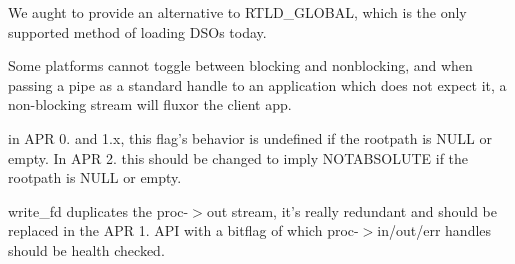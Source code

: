 
\begin{DoxyRefList}
\item[\label{bug__bug000001}%
\hypertarget{bug__bug000001}{}%
Global \hyperlink{group__apr__dso_gaedc8609c2bb76e5c43f2df2281a9d8b6}{apr\-\_\-dso\-\_\-load} (apr\-\_\-dso\-\_\-handle\-\_\-t $\ast$$\ast$res\-\_\-handle, const char $\ast$path, apr\-\_\-pool\-\_\-t $\ast$ctx)]We aught to provide an alternative to R\-T\-L\-D\-\_\-\-G\-L\-O\-B\-A\-L, which is the only supported method of loading D\-S\-Os today.  
\item[\label{bug__bug000003}%
\hypertarget{bug__bug000003}{}%
Global \hyperlink{group__apr__file__io_gaae3b81342d239c58c351cf11190740ed}{apr\-\_\-file\-\_\-pipe\-\_\-create} (apr\-\_\-file\-\_\-t $\ast$$\ast$in, apr\-\_\-file\-\_\-t $\ast$$\ast$out, apr\-\_\-pool\-\_\-t $\ast$pool)]Some platforms cannot toggle between blocking and nonblocking, and when passing a pipe as a standard handle to an application which does not expect it, a non-\/blocking stream will fluxor the client app.  
\item[\label{bug__bug000002}%
\hypertarget{bug__bug000002}{}%
Global \hyperlink{group__apr__filepath_gabb57ce7b23caf512d7f64b92a662ab3d}{A\-P\-R\-\_\-\-F\-I\-L\-E\-P\-A\-T\-H\-\_\-\-N\-O\-T\-A\-B\-O\-V\-E\-R\-O\-O\-T} ]in A\-P\-R 0. and 1.\-x, this flag's behavior is undefined if the rootpath is N\-U\-L\-L or empty. In A\-P\-R 2. this should be changed to imply N\-O\-T\-A\-B\-S\-O\-L\-U\-T\-E if the rootpath is N\-U\-L\-L or empty.  
\item[\label{bug__bug000010}%
\hypertarget{bug__bug000010}{}%
Global \hyperlink{group__apr__thread__proc_gaf8d2be452a819161aa4cd6205a17761e}{apr\-\_\-proc\-\_\-other\-\_\-child\-\_\-register} (\hyperlink{structapr__proc__t}{apr\-\_\-proc\-\_\-t} $\ast$proc, void($\ast$maintenance)(int reason, void $\ast$, int status), void $\ast$data, apr\-\_\-file\-\_\-t $\ast$write\-\_\-fd, apr\-\_\-pool\-\_\-t $\ast$p)]write\-\_\-fd duplicates the proc-\/$>$out stream, it's really redundant and should be replaced in the A\-P\-R 1. A\-P\-I with a bitflag of which proc-\/$>$in/out/err handles should be health checked. 


\end{DoxyRefList}
